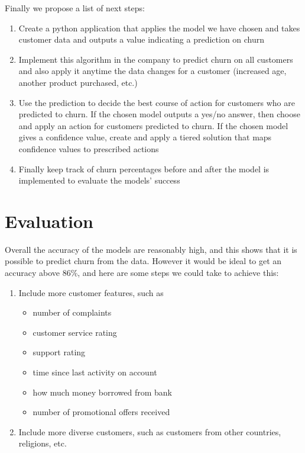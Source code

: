 \documentclass[]{article}
\newcommand{\winningaccuracy}{86\%\xspace}
\begin{document}
Finally we propose a list of next steps:

\begin{enumerate}
	\item Create a python application that applies the model we have chosen and takes customer data and outputs a value indicating a prediction on churn
	\item Implement this algorithm in the company to predict churn on all customers and also apply it anytime the data changes for a customer (increased age, another product purchased, etc.)
	\item Use the prediction to decide the best course of action for customers who are predicted to churn. If the chosen model outputs a yes/no answer, then choose and apply an action for customers predicted to churn. If the chosen model gives a confidence value, create and apply a tiered solution that maps confidence values to prescribed actions
	\item Finally keep track of churn percentages before and after the model is implemented to evaluate the models’ success
\end{enumerate}

\section{Evaluation}

Overall the accuracy of the models are reasonably high, and this shows that it is possible to predict churn from the data. However it would be ideal to get an accuracy above \winningaccuracy, and here are some steps we could take to achieve this:

\begin{enumerate}
	\item Include more customer features, such as 
	\begin{itemize}
		\item number of complaints
		\item customer service rating
		\item support rating
		\item time since last activity on account
		\item how much money borrowed from bank
		\item number of promotional offers received
	\end{itemize}
	\item Include more diverse customers, such as customers from other countries, religions, etc.
\end{enumerate}
\end{document}
